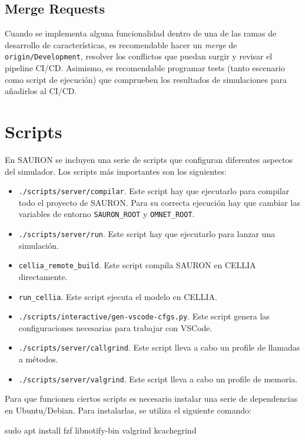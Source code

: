 \subsection{Merge Requests}
Cuando se implementa alguna funcionalidad dentro de una de las ramas de desarrollo de características, es recomendable hacer un \emph{merge} de \verb|origin/Development|, resolver los conflictos que puedan surgir y revisar el pipeline CI/CD.
Asimismo, es recomendable programar tests (tanto escenario como script de ejecución) que comprueben los resultados de simulaciones para añadirlos al CI/CD.

\section{Scripts}
En SAURON se incluyen una serie de scripts que configuran diferentes aspectos del simulador. Los scripts más importantes son los siguientes:

\begin{itemize}
    \item \verb|./scripts/server/compilar|. Este script hay que ejecutarlo para compilar todo el proyecto de SAURON. Para su correcta ejecución hay que cambiar las variables de entorno \verb|SAURON_ROOT| y \verb|OMNET_ROOT|.
    \item \verb|./scripts/server/run|. Este script hay que ejecutarlo para lanzar una simulación.
    \item \verb|cellia_remote_build|. Este script compila SAURON en CELLIA directamente. 
    \item \verb|run_cellia|. Este script ejecuta el modelo en CELLIA.
    \item \verb|./scripts/interactive/gen-vscode-cfgs.py|. Este script genera las configuraciones necesarias para trabajar con VSCode.
    \item \verb|./scripts/server/callgrind|. Este script lleva a cabo un profile de llamadas a métodos.
    \item \verb|./scripts/server/valgrind|. Este script lleva a cabo un profile de memoria.
\end{itemize}

Para que funcionen ciertos scripts es necesario instalar una serie de dependencias en Ubuntu/Debian. Para instalarlas, se utiliza el siguiente comando:

\begin{mycode}[style=bashstyle, label=lst:https-token, caption={Instrucción para instalar las dependencias de SAURON.}]
sudo apt install fzf libnotify-bin valgrind kcachegrind
\end{mycode}

